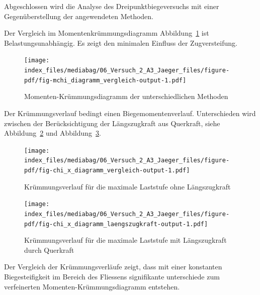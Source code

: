 \documentclass[
  letterpaper,
]{scrreprt}
\begin{document}
Abgeschlossen wird die Analyse des Dreipunktbiegeversuchs mit einer
Gegenüberstellung der angewendeten Methoden.

Der Vergleich im Momentenkrümmungsdiagramm
Abbildung~\ref{fig-mchi_diagramm_vergleich} ist Belastungsunabhängig. Es
zeigt den minimalen Einfluss der Zugversteifung.

\begin{figure}[H]

{\centering \texttt{[image: index\_files/mediabag/06\_Versuch\_2\_A3\_Jaeger\_files/figure-pdf/fig-mchi\_diagramm\_vergleich-output-1.pdf]}

}

\caption{\label{fig-mchi_diagramm_vergleich}Momenten-Krümmungsdiagramm
der unterschiedlichen Methoden}

\end{figure}

Der Krümmungsverlauf bedingt einen Biegemomentenverlauf. Unterschieden
wird zwischen der Berücksichtigung der Längszugkraft aus Querkraft,
siehe Abbildung~\ref{fig-chi_x_diagramm_vergleich} und
Abbildung~\ref{fig-chi_x_diagramm_laengszugkraft}.

\begin{figure}[H]

{\centering \texttt{[image: index\_files/mediabag/06\_Versuch\_2\_A3\_Jaeger\_files/figure-pdf/fig-chi\_x\_diagramm\_vergleich-output-1.pdf]}

}

\caption{\label{fig-chi_x_diagramm_vergleich}Krümmungsverlauf für die
maximale Laststufe ohne Längszugkraft}

\end{figure}

\begin{figure}[H]

{\centering \texttt{[image: index\_files/mediabag/06\_Versuch\_2\_A3\_Jaeger\_files/figure-pdf/fig-chi\_x\_diagramm\_laengszugkraft-output-1.pdf]}

}

\caption{\label{fig-chi_x_diagramm_laengszugkraft}Krümmungsverlauf für
die maximale Laststufe mit Längszugkraft durch Querkraft}

\end{figure}

Der Vergleich der Krümmungsverläufe zeigt, dass mit einer konstanten
Biegesteifigkeit im Bereich des Fliessens signifikante unterschiede zum
verfeinerten Momenten-Krümmungsdiagramm entstehen.
\end{document}
